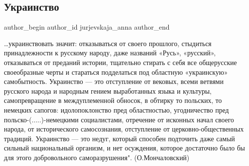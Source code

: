  
 
 
 
 
 
\subsection{Украинство}
\label{sec:25_10_2021.fb.jurjevskaja_anna.1.ukrainstvo}
 
\ifcmt
 author_begin
   author_id jurjevskaja_anna
 author_end
\fi

…украинствовать значит: отказываться от своего прошлого, стыдиться
принадлежности к русскому народу, даже названий «Русь», «русский», отказываться
от преданий истории, тщательно стирать с себя все общерусские своеобразные
черты и стараться подделаться под областную «украинскую» самобытность.
Украинство — это отступление от вековых, всеми ветвями русского народа и
народным гением выработанных языка и культуры, самопревращение в междуплеменной
обносок, в обтирку то польских, то немецких сапогов: идолопоклонство пред
областностью, угодничество пред польско-(.....)-немецкими социалистами,
отречение от исконных начал своего народа, от исторического самосознания,
отступление от церковно-общественных традиций. Украинство — это недуг, который
способен подточить даже самый сильный национальный организм, и нет осуждения,
которое достаточно было бы для этого добровольного
саморазрушения". (О.Мончаловский)
